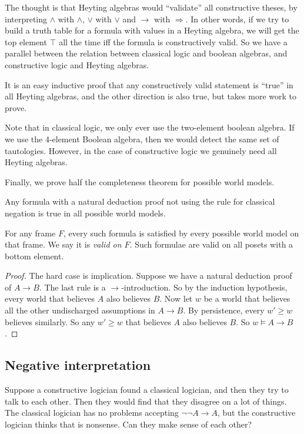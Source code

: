 \documentclass[a4paper]{article}
\begin{document}
The thought is that Heyting algebras would ``validate'' all constructive theses, by interpreting $\wedge$ with $\wedge$, $\vee$ with $\vee$ and $\rightarrow$ with $\Rightarrow$. In other words, if we try to build a truth table for a formula with values in a Heyting algebra, we will get the top element $\top$ all the time iff the formula is constructively valid. So we have a parallel between the relation between classical logic and boolean algebras, and constructive logic and Heyting algebras.

It is an easy inductive proof that any constructively valid statement is ``true'' in all Heyting algebras, and the other direction is also true, but takes more work to prove.

Note that in classical logic, we only ever use the two-element boolean algebra. If we use the 4-element Boolean algebra, then we would detect the same set of tautologies. However, in the case of constructive logic we genuinely need all Heyting algebras.

Finally, we prove half the completeness theorem for possible world models.
\begin{lemma}
  Any formula with a natural deduction proof not using the rule for classical negation is true in all possible world models.
\end{lemma}
For any frame $F$, every such formula is satisfied by every possible world model on that frame. We say it is \emph{valid on $F$}. Such formulae are valid on all posets with a bottom element.

\begin{proof}
  The hard case is implication. Suppose we have a natural deduction proof of $A \to B$. The last rule is a $\to$-introduction. So by the induction hypothesis, every world that believes $A$ also believes $B$. Now let $w$ be a world that believes all the other undischarged assumptions in $A \to B$. By persistence, every $w' \geq w$ believes similarly. So any $w' \geq w$ that believes $A$ also believes $B$. So $w \vDash A \to B$.
\end{proof}


\subsection{Negative interpretation}
Suppose a constructive logician found a classical logician, and then they try to talk to each other. Then they would find that they disagree on a lot of things. The classical logician has no problems accepting $\neg \neg A \to A$, but the constructive logician thinks that is nonsense. Can they make sense of each other?
\end{document}
